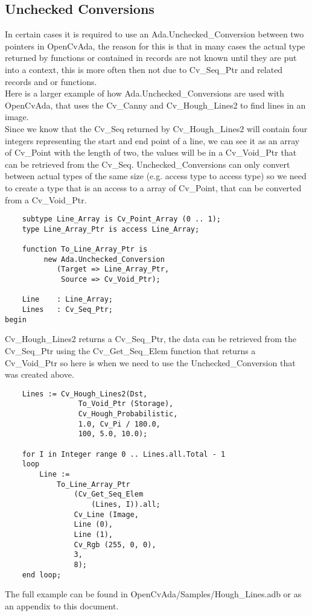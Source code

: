 \subsection{Unchecked Conversions}
In certain cases it is required to use an Ada.Unchecked_Conversion between two pointers in OpenCvAda, the reason for this is that in many cases the actual type returned by functions or contained in records are not known until they are put into a context, this is more often then not due to Cv_Seq_Ptr and related records and or functions.
\\
Here is a larger example of how Ada.Unchecked_Conversions are used with OpenCvAda, that uses the Cv_Canny and Cv_Hough_Lines2 to find lines in an image.
\\
Since we know that the Cv_Seq returned by Cv_Hough_Lines2 will contain four integers representing the start and end point of a line, we can see it as an array of Cv_Point with the length of two, the values will be in a Cv_Void_Ptr that can be retrieved from the Cv_Seq. Unchecked_Conversions can only convert between actual types of the same size (e.g. access type to access type) so we need to create a type that is an access to a array of Cv_Point, that can be converted from a Cv_Void_Ptr.
\begin{lstlisting}
	subtype Line_Array is Cv_Point_Array (0 .. 1);
	type Line_Array_Ptr is access Line_Array;

	function To_Line_Array_Ptr is 
		 new Ada.Unchecked_Conversion 
			(Target => Line_Array_Ptr, 
			 Source => Cv_Void_Ptr);

	Line 	: Line_Array;
	Lines 	: Cv_Seq_Ptr;
begin
\end{lstlisting}
Cv_Hough_Lines2 returns a Cv_Seq_Ptr, the data can be retrieved from the Cv_Seq_Ptr using the Cv_Get_Seq_Elem function that returns a Cv_Void_Ptr so here is when we need to use the Unchecked_Conversion that was created above.
\begin{lstlisting}
	Lines := Cv_Hough_Lines2(Dst, 
				 To_Void_Ptr (Storage), 
				 Cv_Hough_Probabilistic, 
				 1.0, Cv_Pi / 180.0, 
				 100, 5.0, 10.0);

	for I in Integer range 0 .. Lines.all.Total - 1 
	loop
		Line := 
			To_Line_Array_Ptr 
				(Cv_Get_Seq_Elem 
					(Lines, I)).all;
				Cv_Line (Image, 
				Line (0), 
				Line (1), 
				Cv_Rgb (255, 0, 0), 
				3,
				8);
	end loop;
\end{lstlisting}
The full example can be found in OpenCvAda/Samples/Hough_Lines.adb or as an appendix  to this document.
